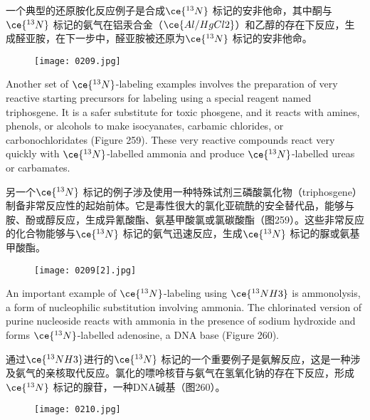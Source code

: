 \documentclass[dvipsnames, svgnames,a4paper,11pt]{article}
\begin{document}
一个典型的还原胺化反应例子是合成\(\ce{^{13}N}\) 标记的安非他命，其中酮与\(\ce{^{13}N}\) 标记的氨气在铝汞合金（\(\ce{Al/HgCl2}\)）和乙醇的存在下反应，生成醛亚胺，在下一步中，醛亚胺被还原为\(\ce{^{13}N}\) 标记的安非他命。

\begin{figure}[h]
	\centering
    \texttt{[image: 0209.jpg]}  
     \label{fig258}
\end{figure}

Another set of \(\ce{^{13}N}\)-labeling examples involves the preparation of very reactive starting precursors for labeling using a special reagent named triphosgene. It is a safer substitute for toxic phosgene, and it reacts with amines, phenols, or alcohols to make isocyanates, carbamic chlorides, or carbonochloridates (Figure 259). These very reactive compounds react very quickly with \(\ce{^{13}N}\)-labelled ammonia and produce \(\ce{^{13}N}\)-labelled ureas or carbamates.

另一个\(\ce{^{13}N}\) 标记的例子涉及使用一种特殊试剂三磷酸氯化物（triphosgene）制备非常反应性的起始前体。它是毒性很大的氯化亚硫酰的安全替代品，能够与胺、酚或醇反应，生成异氰酸酯、氨基甲酸氯或氯碳酸酯（图259）。这些非常反应的化合物能够与\(\ce{^{13}N}\) 标记的氨气迅速反应，生成\(\ce{^{13}N}\) 标记的脲或氨基甲酸酯。

\begin{figure}[h]
	\centering
    \texttt{[image: 0209[2].jpg]} 
     \label{fig259}
\end{figure}

An important example of \(\ce{^{13}N}\)-labeling using \(\ce{^{13}NH3}\) is ammonolysis, a form of nucleophilic substitution involving ammonia. The chlorinated version of purine nucleoside reacts with ammonia in the presence of sodium hydroxide and forms \(\ce{^{13}N}\)-labelled adenosine, a DNA base (Figure 260).

通过\(\ce{^{13}NH3}\)进行的\(\ce{^{13}N}\) 标记的一个重要例子是氨解反应，这是一种涉及氨气的亲核取代反应。氯化的嘌呤核苷与氨气在氢氧化钠的存在下反应，形成\(\ce{^{13}N}\) 标记的腺苷，一种DNA碱基（图260）。

\begin{figure}[h]
	\centering
    \texttt{[image: 0210.jpg]} 
     \label{fig260}
\end{figure}
\end{document}
